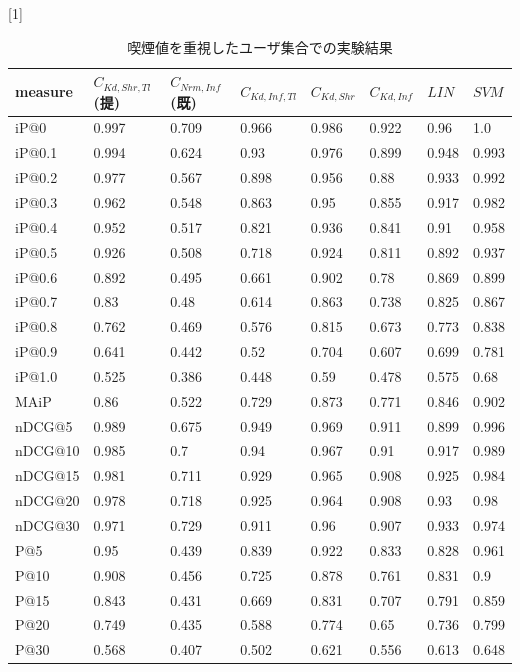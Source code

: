 \begin{table}[h]
  \caption{喫煙値を重視したユーザ集合での実験結果} 
  \label{tbl:resultSmoke}
  \begin{center} {
\scalebox{0.9}[1]{
    \begin{tabular}{|l|l|l|lllll|}\hline
measure&$C_{Kd,Shr,Tl}$(提)&$C_{Nrm,Inf}$(既)&$C_{Kd,Inf,Tl}$&$C_{Kd,Shr}$&$C_{Kd,Inf}$&$LIN$&$SVM$\\ \hline
iP@0&0.997&0.709&0.966&0.986&0.922&0.96&1.0\\
iP@0.1&0.994&0.624&0.93&0.976&0.899&0.948&0.993\\
iP@0.2&0.977&0.567&0.898&0.956&0.88&0.933&0.992\\
iP@0.3&0.962&0.548&0.863&0.95&0.855&0.917&0.982\\
iP@0.4&0.952&0.517&0.821&0.936&0.841&0.91&0.958\\
iP@0.5&0.926&0.508&0.718&0.924&0.811&0.892&0.937\\
iP@0.6&0.892&0.495&0.661&0.902&0.78&0.869&0.899\\
iP@0.7&0.83&0.48&0.614&0.863&0.738&0.825&0.867\\
iP@0.8&0.762&0.469&0.576&0.815&0.673&0.773&0.838\\
iP@0.9&0.641&0.442&0.52&0.704&0.607&0.699&0.781\\
iP@1.0&0.525&0.386&0.448&0.59&0.478&0.575&0.68\\ \hline
MAiP&0.86&0.522&0.729&0.873&0.771&0.846&0.902\\ \hline
nDCG@5&0.989&0.675&0.949&0.969&0.911&0.899&0.996\\
nDCG@10&0.985&0.7&0.94&0.967&0.91&0.917&0.989\\
nDCG@15&0.981&0.711&0.929&0.965&0.908&0.925&0.984\\
nDCG@20&0.978&0.718&0.925&0.964&0.908&0.93&0.98\\
nDCG@30&0.971&0.729&0.911&0.96&0.907&0.933&0.974\\ \hline
P@5&0.95&0.439&0.839&0.922&0.833&0.828&0.961\\
P@10&0.908&0.456&0.725&0.878&0.761&0.831&0.9\\
P@15&0.843&0.431&0.669&0.831&0.707&0.791&0.859\\
P@20&0.749&0.435&0.588&0.774&0.65&0.736&0.799\\
P@30&0.568&0.407&0.502&0.621&0.556&0.613&0.648\\ \hline
\end{tabular}
  }
    }
  \end{center}
\end{table}

